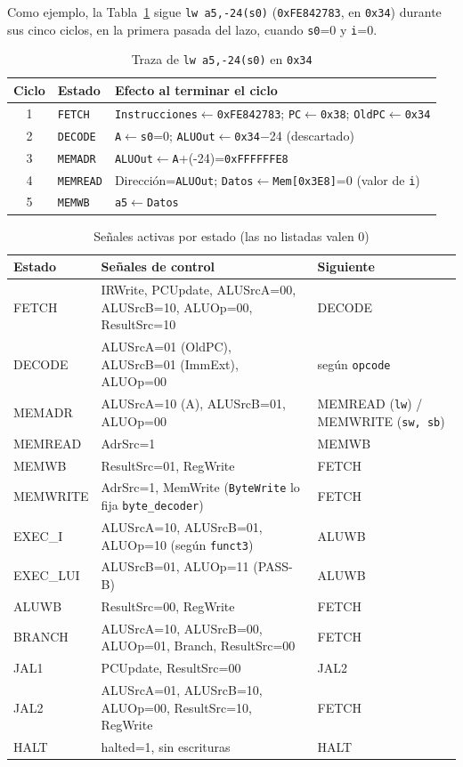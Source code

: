 \documentclass[conference]{IEEEtran}
\newcommand{\cod}[1]{\texttt{\small #1}}
\begin{document}
Como ejemplo, la Tabla~\ref{tab:lw} sigue \cod{lw a5,-24(s0)} (\cod{0xFE842783}, en \cod{0x34}) durante sus cinco ciclos, en la primera pasada del lazo, cuando \cod{s0}=0 y \cod{i}=0.

\begin{table}[t]
\caption{Traza de \cod{lw a5,-24(s0)} en \cod{0x34}}\label{tab:lw}
\centering\footnotesize
\setlength{\tabcolsep}{3pt}\begin{tabular}{@{}clp{5.2cm}@{}}\toprule
Ciclo & Estado & Efecto al terminar el ciclo\\\midrule
1 & \cod{FETCH} & \cod{Instrucciones}$\leftarrow$\cod{0xFE842783}; \cod{PC}$\leftarrow$\cod{0x38}; \cod{OldPC}$\leftarrow$\cod{0x34}\\
2 & \cod{DECODE} & \cod{A}$\leftarrow$\cod{s0}=0; \cod{ALUOut}$\leftarrow$\cod{0x34}$-$24 (descartado)\\
3 & \cod{MEMADR} & \cod{ALUOut}$\leftarrow$\cod{A}+(-24)=\cod{0xFFFFFFE8}\\
4 & \cod{MEMREAD} & Dirección=\cod{ALUOut}; \cod{Datos}$\leftarrow$\cod{Mem[0x3E8]}=0 (valor de \cod{i})\\
5 & \cod{MEMWB} & \cod{a5}$\leftarrow$\cod{Datos}\\\bottomrule
\end{tabular}
\end{table}

\begin{table}[t]
\caption{Señales activas por estado (las no listadas valen 0)}\label{tab:fsm}
\centering\footnotesize
\begin{tabular}{@{}lll@{}}\toprule
Estado & Señales de control & Siguiente\\\midrule
FETCH & IRWrite, PCUpdate, ALUSrcA=00, ALUSrcB=10, ALUOp=00, ResultSrc=10 & DECODE\\
DECODE & ALUSrcA=01 (OldPC), ALUSrcB=01 (ImmExt), ALUOp=00 & según \cod{opcode}\\
MEMADR & ALUSrcA=10 (A), ALUSrcB=01, ALUOp=00 & MEMREAD (\cod{lw}) / MEMWRITE (\cod{sw, sb})\\
MEMREAD & AdrSrc=1 & MEMWB\\
MEMWB & ResultSrc=01, RegWrite & FETCH\\
MEMWRITE & AdrSrc=1, MemWrite (\cod{ByteWrite} lo fija \cod{byte\_decoder}) & FETCH\\
EXEC\_I & ALUSrcA=10, ALUSrcB=01, ALUOp=10 (según \cod{funct3}) & ALUWB\\
EXEC\_LUI & ALUSrcB=01, ALUOp=11 (PASS-B) & ALUWB\\
ALUWB & ResultSrc=00, RegWrite & FETCH\\
BRANCH & ALUSrcA=10, ALUSrcB=00, ALUOp=01, Branch, ResultSrc=00 & FETCH\\
JAL1 & PCUpdate, ResultSrc=00 & JAL2\\
JAL2 & ALUSrcA=01, ALUSrcB=10, ALUOp=00, ResultSrc=10, RegWrite & FETCH\\
HALT & halted=1, sin escrituras & HALT\\\bottomrule
\end{tabular}
\end{table}
\end{document}
